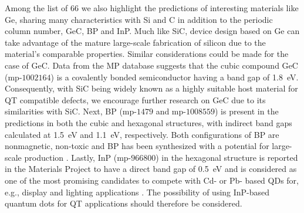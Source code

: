 \documentclass[superscriptaddress,
preprint,
 amsmath,amssymb,
 aps,
]{revtex4-2}
\newcommand{\mrk}[1]{\textcolor{red}{#1}}
\begin{document}
Among the list of $66$ we also highlight the predictions of interesting materials like Ge, sharing many characteristics with Si and C in addition to the periodic column number,  %
GeC, BP and InP. 
Much like SiC, device design based on Ge can take advantage of the mature large-scale fabrication of silicon due to the material's comparable properties.  
Similar considerations could be made for the case of GeC. 
Data from the MP database suggests that the cubic compound GeC (mp-$1002164$) is a covalently bonded semiconductor having a band gap of \SI{1.8}{\electronvolt}. 
Consequently, with SiC being widely known as a highly suitable host material for QT compatible defects, we encourage further research on GeC due to its similarities with SiC. 
Next, BP (mp-$1479$ and mp-$1008559$) is present in the predictions in both the cubic and hexagonal structures, with indirect band gaps calculated at \SI{1.5}{\electronvolt} and \SI{1.1}{\electronvolt}, respectively. Both configurations of BP are nonmagnetic, non-toxic and BP has been synthesized with a potential for large-scale production \cite{MukhanovVladimirA2016Umso}. 
Lastly, InP (mp-$966800$) 
in the hexagonal structure 
is reported in the Materials Project to have a direct band gap of \SI{0.5}{\electronvolt} and is considered as one of the most promising candidates to compete with Cd- or Pb- based QDs for, e.g., display and lighting applications  \cite{Zhang2020a, Won2019}. 
The possibility of using InP-based quantum dots for QT applications should therefore be considered.  

\end{document}
